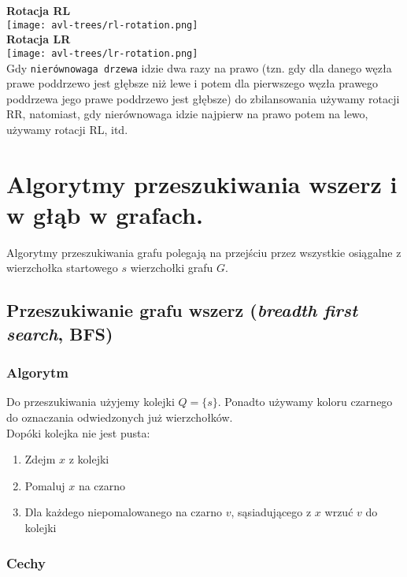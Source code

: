 \documentclass[main.tex]{subfiles}
\begin{document}
    \textbf{Rotacja RL} \\

    \texttt{[image: avl-trees/rl-rotation.png]} \\

    \textbf{Rotacja LR} \\

    \texttt{[image: avl-trees/lr-rotation.png]} \\

    \noindent Gdy \texttt{nierównowaga drzewa} idzie dwa razy na prawo (tzn. gdy dla danego węzła prawe poddrzewo jest głębsze niż lewe i potem dla pierwszego węzła prawego poddrzewa jego prawe poddrzewo jest głębsze) do zbilansowania używamy rotacji RR, natomiast, gdy nierównowaga idzie najpierw na prawo potem na lewo, używamy rotacji RL, itd.

    \newpage

    \section{Algorytmy przeszukiwania wszerz i w głąb w grafach.}

    Algorytmy przeszukiwania grafu polegają na przejściu przez wszystkie osiągalne z wierzchołka
    startowego $s$ wierzchołki grafu $G$.

    \subsection{Przeszukiwanie grafu wszerz (\textit{breadth first search}, BFS)}

    \subsubsection{Algorytm}

    Do przeszukiwania użyjemy kolejki $Q = \{s\}$. Ponadto używamy koloru czarnego do
    oznaczania odwiedzonych już wierzchołków.\[\]
    Dopóki kolejka nie jest pusta:
    \begin{enumerate}
        \item Zdejm $x$ z kolejki
        \item Pomaluj $x$ na czarno
        \item Dla każdego niepomalowanego na czarno $v$, sąsiadującego z $x$ wrzuć
        $v$ do kolejki
    \end{enumerate}

    \subsubsection{Cechy}
\end{document}
